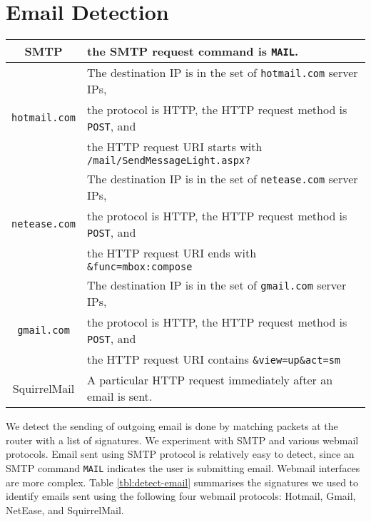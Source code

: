 \chapter{Email Detection}
\label{appendix:email}

\begin{table*}[bt]
  \centering
  \begin{tabular}{|c|l|}
  \hline
  SMTP     & the SMTP request command is {\tt MAIL}. \\
  \hline
           & The destination IP is in the set of {\tt hotmail.com} server IPs,  \\
  {\tt hotmail.com}  & the protocol is HTTP,
           the HTTP request method is {\tt POST}, and \\
           & the HTTP request URI starts with {\tt /mail/SendMessageLight.aspx?} \\
  \hline
           & The destination IP is in the set of {\tt netease.com} server IPs, \\
  {\tt netease.com}  & the protocol is HTTP,
           the HTTP request method is {\tt POST}, and \\
           & the HTTP request URI ends with {\tt \&func=mbox:compose} \\
  \hline
           & The destination IP is in the set of {\tt gmail.com} server IPs, \\
  {\tt gmail.com}    & the protocol is HTTP,
           the HTTP request method is {\tt POST}, and \\
           & the HTTP request URI contains {\tt \&view=up\&act=sm} \\
  \hline
  SquirrelMail & A particular HTTP request immediately after an email is sent. \\ [0.5ex]
  \hline
  \end{tabular}
  \caption{Rules for email detection. }\label{tbl:detect-email}
\end{table*}

We detect the sending of outgoing email is done by matching packets 
at the router with a list of signatures. 
We experiment with SMTP and various webmail protocols.
Email sent using SMTP protocol is relatively easy to detect, since
an SMTP command {\tt MAIL} indicates the user is submitting email.
Webmail interfaces are more complex.
Table \ref{tbl:detect-email} summarises
the signatures we used to identify emails sent using the following
four webmail protocols: Hotmail, Gmail, NetEase, and SquirrelMail.

